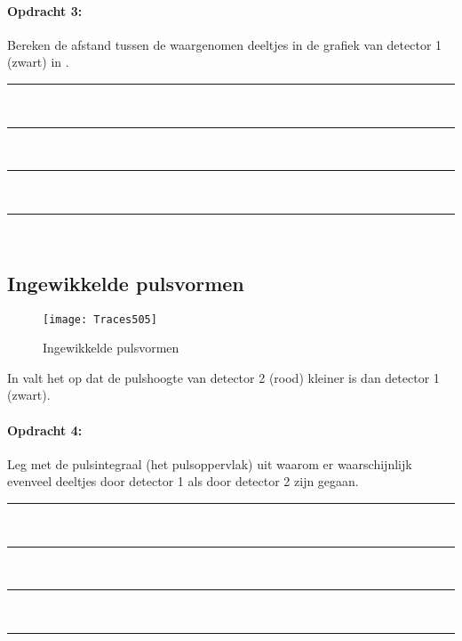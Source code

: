 \bigskip{}


\begin{minipage}[t]{1\columnwidth}%

\paragraph{Opdracht 3:}

Bereken de afstand tussen de waargenomen deeltjes in de grafiek
van detector 1 (zwart) in .

\begin{center}
    \rule{\textwidth}{0.3mm}\\
    \rule{\textwidth}{0.3mm}\\
    \rule{\textwidth}{0.3mm}\\
    \rule{\textwidth}{0.3mm}\\
\end{center}
\end{minipage}


\subsection{Ingewikkelde pulsvormen}

\begin{figure}[ht]
    \centering
    \texttt{[image: Traces505]}
    \caption{Ingewikkelde pulsvormen}
    \label{fig:Ingewikkelde-pulsvormen}
\end{figure}


\bigskip{}

In  valt het op dat de pulshoogte
van detector 2 (rood) kleiner is dan detector 1 (zwart).

\begin{minipage}[t]{1\columnwidth}%

\paragraph{Opdracht 4:}

Leg met de pulsintegraal (het pulsoppervlak) uit waarom er
waarschijnlijk evenveel deeltjes door detector 1 als door detector
2 zijn gegaan.

\begin{center}
    \rule{\textwidth}{0.3mm}\\
    \rule{\textwidth}{0.3mm}\\
    \rule{\textwidth}{0.3mm}\\
    \rule{\textwidth}{0.3mm}\\
\end{center}
\end{minipage}

